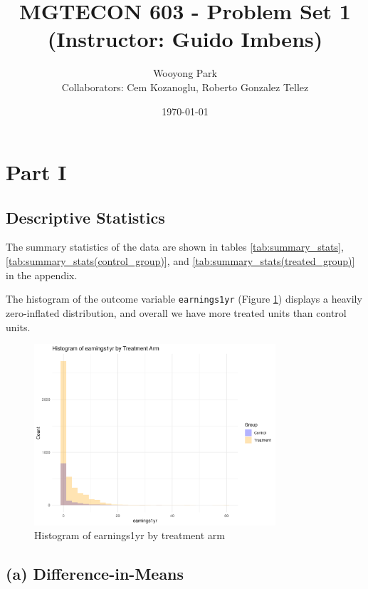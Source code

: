 \documentclass[11pt]{article}
\title{MGTECON 603 - Problem Set 1\\ \small{(Instructor: Guido Imbens)}}
\author{Wooyong Park\\Collaborators: Cem Kozanoglu, Roberto Gonzalez Tellez}
\date{\today}
\numberwithin{equation}{section}
\begin{document}
\maketitle

\section{Part I}

\subsection*{Descriptive Statistics}

The summary statistics of the data are shown in tables \ref{tab:summary_stats}, \ref{tab:summary_stats(control_group)}, and \ref{tab:summary_stats(treated_group)} in the appendix.

The histogram of the outcome variable \verb|earnings1yr| (Figure \ref{fig:hist_earnings1yr}) displays a heavily zero-inflated distribution, and overall we have more treated units than control units.

\begin{figure}[h]
    \centering
    \includegraphics[width=0.8\textwidth]{output/histogram_earnings1yr_by_treatment_arm.png}
    \caption{\label{fig:hist_earnings1yr}Histogram of earnings1yr by treatment arm}
\end{figure}





\subsection*{(a) Difference-in-Means}
\end{document}
